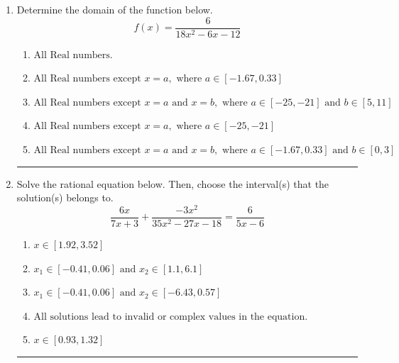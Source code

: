 \documentclass[14pt]{extbook}
\newcommand{\litem}[1]{\item#1\hspace*{-1cm}\rule{\textwidth}{0.4pt}}
\begin{document}
\begin{enumerate}
{\begin{enumerate}[label=\Alph*.]
\end{enumerate} }
\litem{
Determine the domain of the function below.\[ f(x) = \frac{6}{18x^{2} -6 x -12} \]\begin{enumerate}[label=\Alph*.]
\item \( \text{All Real numbers.} \)
\item \( \text{All Real numbers except } x = a, \text{ where } a \in [-1.67, 0.33] \)
\item \( \text{All Real numbers except } x = a \text{ and } x = b, \text{ where } a \in [-25, -21] \text{ and } b \in [5, 11] \)
\item \( \text{All Real numbers except } x = a, \text{ where } a \in [-25, -21] \)
\item \( \text{All Real numbers except } x = a \text{ and } x = b, \text{ where } a \in [-1.67, 0.33] \text{ and } b \in [0, 3] \)

\end{enumerate} }
\litem{
Solve the rational equation below. Then, choose the interval(s) that the solution(s) belongs to.\[ \frac{6x}{7x + 3} + \frac{-3x^{2}}{35x^{2} -27 x -18} = \frac{6}{5x -6} \]\begin{enumerate}[label=\Alph*.]
\item \( x \in [1.92,3.52] \)
\item \( x_1 \in [-0.41, 0.06] \text{ and } x_2 \in [1.1,6.1] \)
\item \( x_1 \in [-0.41, 0.06] \text{ and } x_2 \in [-6.43,0.57] \)
\item \( \text{All solutions lead to invalid or complex values in the equation.} \)
\item \( x \in [0.93,1.32] \)

\end{enumerate} }
\end{enumerate}
\end{document}
